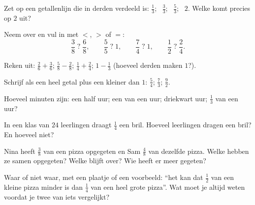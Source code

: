 \begin{exercise}[$\star$]\label{exo:g4:fractions:4}
Zet op een getallenlijn die in derden verdeeld is: $\frac13$; \
$\frac33$; \ $\frac53$; \ $2$. Welke  komt precies op $2$ uit?
\end{exercise}

\begin{exercise}[$\star$]\label{exo:g4:fractions:5}
Neem over en vul in met $<$, $>$ of $=$:
\[
\frac38 \;?\; \frac68, \qquad
\frac55 \;?\; 1, \qquad
\frac74 \;?\; 1, \qquad
\frac12 \;?\; \frac24 .
\]
\end{exercise}

\begin{exercise}[$\star$]\label{exo:g4:fractions:6}
Reken uit: $\frac26 + \frac36$; \quad $\frac58 - \frac28$; \quad
$\frac14 + \frac24$; \quad $1 - \frac13$ (hoeveel derden maken $1$?).
\end{exercise}

\begin{exercise}[$\star$]\label{exo:g4:fractions:7}
Schrijf als een heel getal plus een  kleiner dan $1$:
$\frac54$; \quad $\frac73$; \quad $\frac{9}{2}$.
\end{exercise}

\begin{exercise}[$\star$]\label{exo:g4:fractions:8}
Hoeveel minuten zijn: een half uur; een  van een uur; driekwart uur;
$\frac13$ van een uur?
\end{exercise}

\begin{exercise}[$\star$]\label{exo:g4:fractions:9}
In een klas van $24$ leerlingen draagt $\frac14$ een bril. Hoeveel
leerlingen dragen een bril? En hoeveel niet?
\end{exercise}

\begin{exercise}[$\star\star$]\label{exo:g4:fractions:10}
Nina heeft $\frac38$ van een pizza opgegeten en Sam $\frac48$ van dezelfde
pizza. Welke  hebben ze samen opgegeten? Welke \omterm{def:g4:fractions:def}{breuk} blijft over? Wie
heeft er meer gegeten?
\end{exercise}

\begin{exercise}[$\star\star$]\label{exo:g4:fractions:11}
Waar of niet waar, met een plaatje of een voorbeeld: ``het kan dat
$\frac12$ van een kleine pizza minder is dan $\frac14$ van een heel grote
pizza''. Wat moet je altijd weten voordat je twee  van iets
vergelijkt?
\end{exercise}
